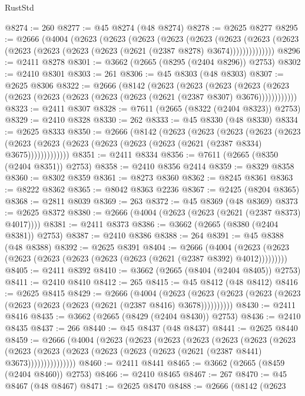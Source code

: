 \begin{lexlean}{RustStd}
\begin{coremodule}
@8274 := 260
@8277 := @45 @8274 (@48 @8274)
@8278 := @2625 @8277
@8295 := @2666
    (@4004
      (@2623
        (@2623
          (@2623
            (@2623
              (@2623
                (@2623
                  (@2623 (@2623 (@2623 (@2623 (@2623 (@2623 (@2621 (@2387 @8278) @3674))))))))))))))
@8296 := @2411 @8278
@8301 := @3662 (@2665 (@8295 (@2404 @8296)) @2753)
@8302 := @2410 @8301
@8303 := 261
@8306 := @45 @8303 (@48 @8303)
@8307 := @2625 @8306
@8322 := @2666
    (@8142
      (@2623
        (@2623
          (@2623
            (@2623 (@2623 (@2623 (@2623 (@2623 (@2623 (@2623 (@2621 (@2387 @8307) @3676))))))))))))
@8323 := @2411 @8307
@8328 := @7611 (@2665 (@8322 (@2404 @8323)) @2753)
@8329 := @2410 @8328
@8330 := 262
@8333 := @45 @8330 (@48 @8330)
@8334 := @2625 @8333
@8350 := @2666
    (@8142
      (@2623
        (@2623
          (@2623
            (@2623
              (@2623
                (@2623 (@2623 (@2623 (@2623 (@2623 (@2623 (@2621 (@2387 @8334) @3675)))))))))))))
@8351 := @2411 @8334
@8356 := @7611 (@2665 (@8350 (@2404 @8351)) @2753)
@8358 := @2410 @8356 @2414
@8359 := @8329 @8358
@8360 := @8302 @8359
@8361 := @8273 @8360
@8362 := @8245 @8361
@8363 := @8222 @8362
@8365 := @8042 @8363 @2236
@8367 := @2425 (@8204 @8365)
@8368 := @2811 @8039
@8369 := 263
@8372 := @45 @8369 (@48 @8369)
@8373 := @2625 @8372
@8380 := @2666 (@4004 (@2623 (@2623 (@2621 (@2387 @8373) @4017))))
@8381 := @2411 @8373
@8386 := @3662 (@2665 (@8380 (@2404 @8381)) @2753)
@8387 := @2410 @8386
@8388 := 264
@8391 := @45 @8388 (@48 @8388)
@8392 := @2625 @8391
@8404 := @2666
    (@4004 (@2623 (@2623 (@2623 (@2623 (@2623 (@2623 (@2623 (@2621 (@2387 @8392) @4012)))))))))
@8405 := @2411 @8392
@8410 := @3662 (@2665 (@8404 (@2404 @8405)) @2753)
@8411 := @2410 @8410
@8412 := 265
@8415 := @45 @8412 (@48 @8412)
@8416 := @2625 @8415
@8429 := @2666
    (@4004
      (@2623 (@2623 (@2623 (@2623 (@2623 (@2623 (@2623 (@2623 (@2621 (@2387 @8416) @3678))))))))))
@8430 := @2411 @8416
@8435 := @3662 (@2665 (@8429 (@2404 @8430)) @2753)
@8436 := @2410 @8435
@8437 := 266
@8440 := @45 @8437 (@48 @8437)
@8441 := @2625 @8440
@8459 := @2666
    (@4004
      (@2623
        (@2623
          (@2623
            (@2623
              (@2623
                (@2623
                  (@2623
                    (@2623
                      (@2623 (@2623 (@2623 (@2623 (@2623 (@2621 (@2387 @8441) @3673)))))))))))))))
@8460 := @2411 @8441
@8465 := @3662 (@2665 (@8459 (@2404 @8460)) @2753)
@8466 := @2410 @8465
@8467 := 267
@8470 := @45 @8467 (@48 @8467)
@8471 := @2625 @8470
@8488 := @2666
    (@8142
      (@2623

\end{coremodule}
\end{lexlean}
